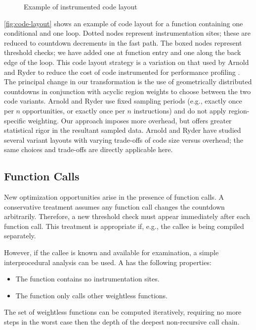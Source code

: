 \begin{figure}
  \centering
  
  \caption{Example of instrumented code layout}
  \label{fig:code-layout}
\end{figure}

\autoref{fig:code-layout} shows an example of code layout for a
function containing one conditional and one loop.  Dotted nodes
represent instrumentation sites; these are reduced to countdown
decrements in the fast path.  The boxed nodes represent threshold
checks; we have added one at function entry and one along the back
edge of the loop.  This code layout strategy is a variation on that
used by Arnold and Ryder to reduce the cost of code instrumented for
performance profiling \cite{Arnold:2001:FRC}.  The principal change in
our transformation is the use of geometrically distributed countdowns
in conjunction with acyclic region weights to choose between the two
code variants.  Arnold and Ryder use fixed sampling periods (e.g.,
exactly once per $n$ opportunities, or exactly once per $n$
instructions) and do not apply region-specific weighting.  Our
approach imposes more overhead, but offers greater statistical rigor
in the resultant sampled data.  Arnold and Ryder have studied several
variant layouts with varying trade-offs of code size versus overhead;
the same choices and trade-offs are directly applicable here.

\subsection{Function Calls}

New optimization opportunities arise in the presence of function
calls.  A conservative treatment assumes any function call changes the
countdown arbitrarily.  Therefore, a new threshold check must appear
immediately after each function call.  This treatment is appropriate
if, e.g., the callee is being compiled separately.

However, if the callee is known and available for examination, a
simple interprocedural analysis can be used.  A  has the following properties:

\begin{itemize}
\item The function contains no instrumentation sites.
\item The function only calls other weightless functions.
\end{itemize}

The set of weightless functions can be computed iteratively, requiring
no more steps in the worst case then the depth of the deepest
non-recursive call chain.

